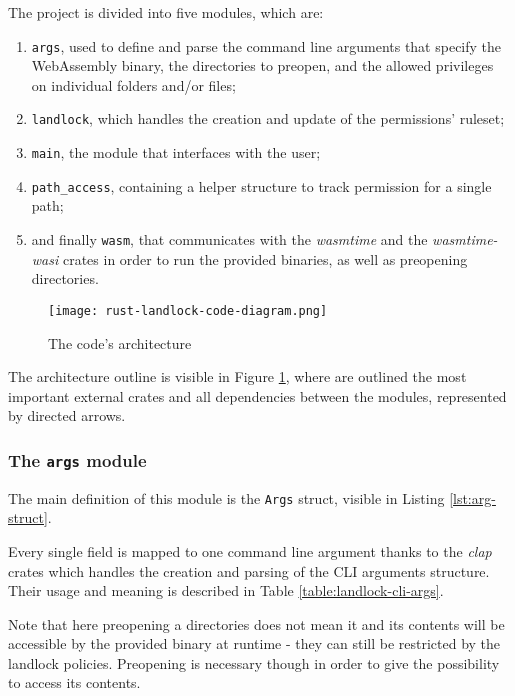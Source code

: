 The project is divided into five modules, which are:
\begin{enumerate}
  \item \texttt{args}, used to define and parse the command line arguments that specify the WebAssembly binary,
        the directories to preopen, and the allowed privileges on individual folders and/or files;
  \item \texttt{landlock}, which handles the creation and update of the permissions' ruleset;
  \item \texttt{main}, the module that interfaces with the user;
  \item \texttt{path\_access}, containing a helper structure to track permission for a single path;
  \item and finally \texttt{wasm}, that communicates with the \textit{wasmtime} and the \textit{wasmtime-wasi} crates
        in order to run the provided binaries, as well as preopening directories.
\end{enumerate}

\begin{figure}[h]
  \centering
  \texttt{[image: rust-landlock-code-diagram.png]}
  \caption{The code's architecture}
  \label{fig:rust-landlock-code-architecture}
\end{figure}

The architecture outline is visible in Figure \ref{fig:rust-landlock-code-architecture}, where
are outlined the most important external crates and all dependencies between the modules, represented
by directed arrows.

\subsubsection{The \texttt{args} module}

The main definition of this module is the \texttt{Args} struct, visible in Listing \ref{lst:arg-struct}.

Every single field is mapped to one command line argument thanks to the \textit{clap} crates which handles the
creation and parsing of the CLI arguments structure.
Their usage and meaning is described in Table \ref{table:landlock-cli-args}.

Note that here preopening a directories does not mean it and its contents will be accessible by the
provided binary at runtime - they can still be restricted by the landlock policies. Preopening is
necessary though in order to give the possibility to access its contents.

